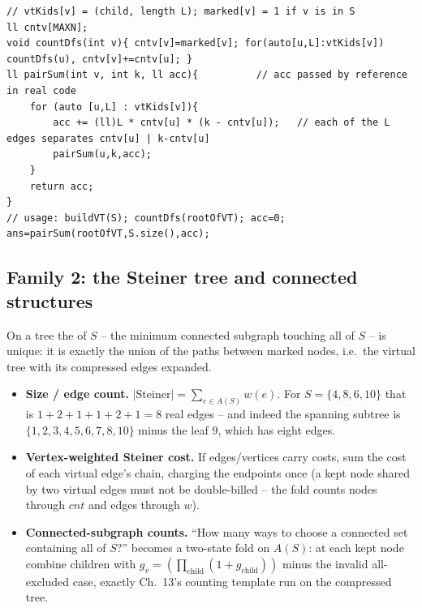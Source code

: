 \begin{lstlisting}[caption={Sum of pairwise distances over a marked set via its virtual tree. One bottom-up count, then the per-edge separation formula. ASCII only}, label={lst:c30-pairsum}]
// vtKids[v] = (child, length L); marked[v] = 1 if v is in S
ll cntv[MAXN];
void countDfs(int v){ cntv[v]=marked[v]; for(auto[u,L]:vtKids[v]) countDfs(u), cntv[v]+=cntv[u]; }
ll pairSum(int v, int k, ll acc){          // acc passed by reference in real code
    for (auto [u,L] : vtKids[v]){
        acc += (ll)L * cntv[u] * (k - cntv[u]);   // each of the L edges separates cntv[u] | k-cntv[u]
        pairSum(u,k,acc);
    }
    return acc;
}
// usage: buildVT(S); countDfs(rootOfVT); acc=0; ans=pairSum(rootOfVT,S.size(),acc);
\end{lstlisting}

\subsection{Family 2: the Steiner tree and connected structures}

On a tree the  of \(S\) -- the minimum connected subgraph touching
all of \(S\) -- is unique: it is exactly the union of the paths between marked nodes,
i.e.\ the virtual tree with its compressed edges expanded.

\begin{itemize}[leftmargin=1.4em]
  \item \textbf{Size / edge count.} \(|\text{Steiner}| = \sum_{e\in A(S)} \mathit{w}(e)\).
        For \(S=\{4,8,6,10\}\) that is \(1+2+1+1+2+1=\boxed{8}\) real edges -- and indeed
        the spanning subtree is \(\{1,2,3,4,5,6,7,8,10\}\) minus the leaf \(9\), which has
        eight edges.
  \item \textbf{Vertex-weighted Steiner cost.} If edges/vertices carry costs, sum the
        cost of each virtual edge's chain, charging the endpoints once (a kept node shared
        by two virtual edges must not be double-billed -- the fold counts nodes through
        \(\mathit{cnt}\) and edges through \(\mathit{w}\)).
  \item \textbf{Connected-subgraph counts.} ``How many ways to choose a connected set
        containing all of \(S\)?'' becomes a two-state fold on \(A(S)\): at each kept
        node combine children with \(g_v=(\prod_{\text{child}}(1+g_{\text{child}}))\)
        minus the invalid all-excluded case, exactly Ch.~13's counting template run on the
        compressed tree.
\end{itemize}


